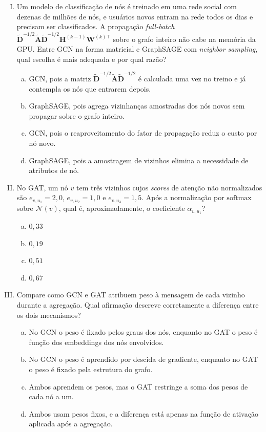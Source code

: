 \documentclass{dlproblemset}
\begin{document}
\begin{enumerate}[I)]
    \item Um modelo de classificação de nós é treinado em uma rede social com dezenas de milhões de nós, e usuários novos entram na rede todos os dias e precisam ser classificados. A propagação \textit{full-batch} $\tilde{\mathbf{D}}^{-1/2} \tilde{\mathbf{A}} \tilde{\mathbf{D}}^{-1/2} \mathbf{H}^{(k-1)} \mathbf{W}^{(k)\top}$ sobre o grafo inteiro não cabe na memória da GPU. Entre GCN na forma matricial e GraphSAGE com \textit{neighbor sampling}, qual escolha é mais adequada e por qual razão?
    \begin{enumerate}[(a)]
        \item GCN, pois a matriz $\tilde{\mathbf{D}}^{-1/2} \tilde{\mathbf{A}} \tilde{\mathbf{D}}^{-1/2}$ é calculada uma vez no treino e já contempla os nós que entrarem depois.
        \item GraphSAGE, pois agrega vizinhanças amostradas dos nós novos sem propagar sobre o grafo inteiro.
        \item GCN, pois o reaproveitamento do fator de propagação reduz o custo por nó novo.
        \item GraphSAGE, pois a amostragem de vizinhos elimina a necessidade de atributos de nó.
    \end{enumerate}

    \item No GAT, um nó $v$ tem três vizinhos cujos \textit{scores} de atenção não normalizados são $e_{v,u_1} = 2{,}0$, $e_{v,u_2} = 1{,}0$ e $e_{v,u_3} = 1{,}5$. Após a normalização por $\mathrm{softmax}$ sobre $\mathcal{N}(v)$, qual é, aproximadamente, o coeficiente $\alpha_{v,u_1}$?
    \begin{enumerate}[(a)]
        \item $0{,}33$
        \item $0{,}19$
        \item $0{,}51$
        \item $0{,}67$
    \end{enumerate}

    \item Compare como GCN e GAT atribuem peso à mensagem de cada vizinho durante a agregação. Qual afirmação descreve corretamente a diferença entre os dois mecanismos?
    \begin{enumerate}[(a)]
        \item No GCN o peso é fixado pelos graus dos nós, enquanto no GAT o peso é função dos embeddings dos nós envolvidos.
        \item No GCN o peso é aprendido por descida de gradiente, enquanto no GAT o peso é fixado pela estrutura do grafo.
        \item Ambos aprendem os pesos, mas o GAT restringe a soma dos pesos de cada nó a um.
        \item Ambos usam pesos fixos, e a diferença está apenas na função de ativação aplicada após a agregação.
    \end{enumerate}


\end{enumerate}
\end{document}
